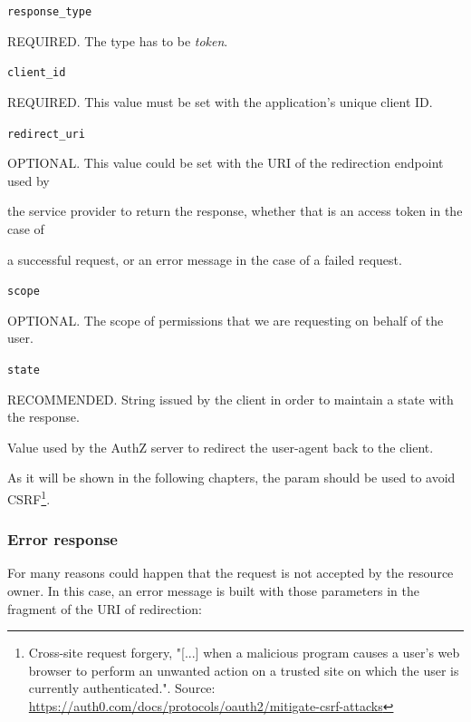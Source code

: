 \texttt{response\_type}

\hspace{0.5cm}REQUIRED. The type has to be \textit{token}.

\texttt{client\_id}

\hspace{0.5cm}REQUIRED. This value must be set with the application's unique client ID.

\texttt{redirect\_uri}

\hspace{0.5cm}OPTIONAL. This value could be set with the URI of the redirection endpoint used by 

\hspace{0.5cm}the service provider to return the response, whether that is an access token in the case of

\hspace{0.5cm} a successful request, or an error message in the case of a failed request.

\texttt{scope}

\hspace{0.5cm}OPTIONAL. The scope of permissions that we are requesting on behalf of the user.

\vspace{0.5cm}

\texttt{state}

\hspace{0.5cm}RECOMMENDED. String issued by the client in order to maintain a state with the response.

\hspace{0.5cm}Value used by the AuthZ server to redirect the user-agent back to the client.

\hspace{0.5cm}As it will be shown in the following chapters, the param should be used to avoid CSRF\footnote{Cross-site request forgery, "[...] when a malicious program causes a user's web browser to perform an unwanted action on a trusted site on which the user is currently authenticated.". Source: \url{https://auth0.com/docs/protocols/oauth2/mitigate-csrf-attacks}}.

\subsubsection{Error response}
\label{tokenerr}
For many reasons could happen that the request is not accepted by the resource owner. In this case, an error message is built with those parameters in the fragment of the URI of redirection:

